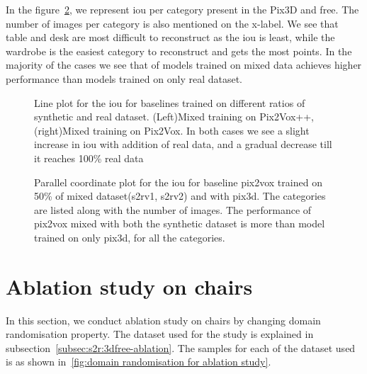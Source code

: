 In the figure~\ref{fig:mixed2}, we represent \gls{iou} per category present in the Pix3D and \gls{free}.
The number of images per category is also mentioned on the x-label.
We see that table and desk are most difficult to reconstruct as the \gls{iou} is least, while the wardrobe is the easiest category to reconstruct and gets the most points.
In the majority of the cases we see that  of models trained on mixed data achieves higher performance than models trained on only real dataset.

\begin{figure}
    \centering
    \resizebox{0.49\linewidth}{!}{}
    \resizebox{0.49\linewidth}{!}{}
    \caption{Line plot for the \gls{iou}  for baselines trained on different ratios of synthetic and real dataset.
        (Left)Mixed training on Pix2Vox++, (right)Mixed training on Pix2Vox. In both cases we see a slight increase in \gls{iou} with addition of real data, and a gradual decrease till it reaches 100\% real data}
    \label{fig:mixed1}
\end{figure}

\begin{figure}
    \centering
    \resizebox{\textwidth}{!}{}
    \caption{Parallel coordinate plot for the \gls{iou} for baseline pix2vox trained on 50\% of mixed dataset(\gls{s2rv1}, \gls{s2rv2}) and with pix3d.
    The categories are listed along with the number of images.
    The performance of pix2vox mixed with both the synthetic dataset is more than model trained on only pix3d, for all the categories.}
    \label{fig:mixed2}
\end{figure}

\section{Ablation study on chairs}\label{sec:ablation-study-on-chairs}
In this section, we conduct ablation study on chairs by changing domain randomisation property.
The dataset used for the study is explained in subsection~\ref{subsec:s2r:3dfree-ablation}.
The samples for  each of the dataset used is as shown in~\ref{fig:domain randomisation for ablation study}.

